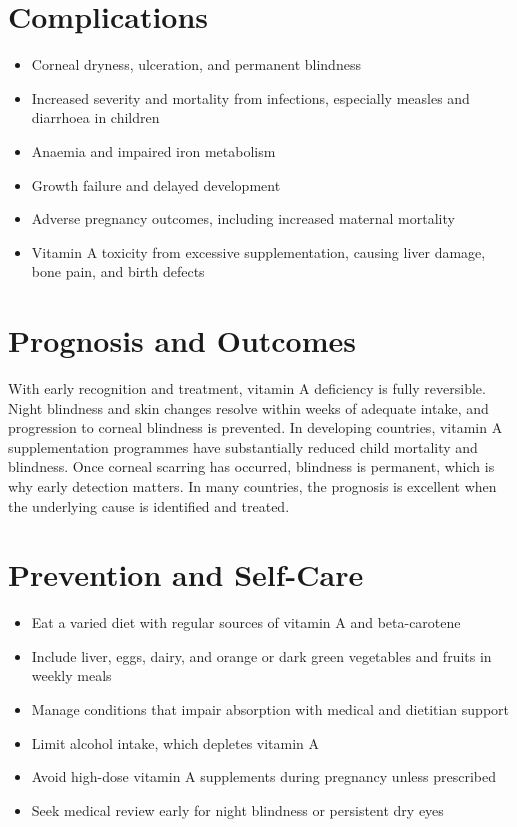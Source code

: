 \section*{Complications}
\begin{itemize}
    \item Corneal dryness, ulceration, and permanent blindness
    \item Increased severity and mortality from infections, especially measles and diarrhoea in children
    \item Anaemia and impaired iron metabolism
    \item Growth failure and delayed development
    \item Adverse pregnancy outcomes, including increased maternal mortality
    \item Vitamin A toxicity from excessive supplementation, causing liver damage, bone pain, and birth defects
\end{itemize}

\section*{Prognosis and Outcomes}
With early recognition and treatment, vitamin A deficiency is fully reversible. Night blindness and skin changes resolve within weeks of adequate intake, and progression to corneal blindness is prevented. In developing countries, vitamin A supplementation programmes have substantially reduced child mortality and blindness. Once corneal scarring has occurred, blindness is permanent, which is why early detection matters. In many countries, the prognosis is excellent when the underlying cause is identified and treated.

\section*{Prevention and Self-Care}
\begin{itemize}
    \item Eat a varied diet with regular sources of vitamin A and beta-carotene
    \item Include liver, eggs, dairy, and orange or dark green vegetables and fruits in weekly meals
    \item Manage conditions that impair absorption with medical and dietitian support
    \item Limit alcohol intake, which depletes vitamin A
    \item Avoid high-dose vitamin A supplements during pregnancy unless prescribed
    \item Seek medical review early for night blindness or persistent dry eyes
\end{itemize}

